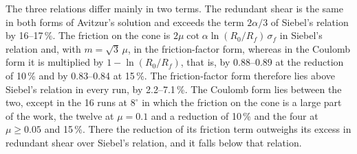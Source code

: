 The three relations differ mainly in two terms. The redundant shear is the same in both forms of
Avitzur's solution and exceeds the term $2\alpha/3$ of Siebel's relation by 16--17\,\%. The
friction on the cone is $2\mu\cot\alpha\ln(R_0/R_f)\,\sigma_f$ in Siebel's relation and, with
$m=\sqrt3\,\mu$, in the friction-factor form, whereas in the Coulomb form it is multiplied by
$1-\ln(R_0/R_f)$, that is, by 0.88--0.89 at the reduction of 10\,\% and by 0.83--0.84 at 15\,\%.
The friction-factor form therefore lies above Siebel's relation in every run, by 2.2--7.1\,\%.
The Coulomb form lies between the two, except in the 16 runs at $8^\circ$ in which the friction on
the cone is a large part of the work, the twelve at $\mu = 0.1$ and a reduction of 10\,\% and the
four at $\mu \ge 0.05$ and 15\,\%. There the reduction of its friction term outweighs its excess
in redundant shear over Siebel's relation, and it falls below that relation.

